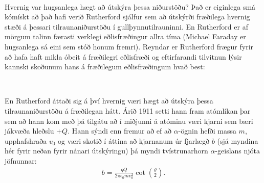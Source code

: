\ifdefined \wholebook \else\documentclass[oneside]{book}\usepackage{EdlBook}\graphicspath{{figures/}}
\begin{document}
\begin{tcolorbox}

 \\

\vspace{-0.3cm}
\end{tcolorbox}

Hvernig var hugsanlega hægt að útskýra þessa niðurstöðu? Það er eiginlega smá kómískt að það hafi verið Rutherford sjálfur sem að útskýrði fræðilega hvernig stæði á þessari tilraunaniðurstöðu í gullþynnutilrauninni. En Rutherford er af mörgum talinn færasti verklegi eðlisfræðingur allra tíma (Michael Faraday er hugsanlega sá eini sem stóð honum fremri). Reyndar er Rutherford frægur fyrir að hafa haft mikla óbeit á fræðilegri eðlisfræði og eftirfarandi tilvitnun lýsir kannski skoðunum hans á fræðilegum eðlisfræðingum hvað best:

\begin{tcolorbox}

 \\

\vspace{-0.3cm}
\end{tcolorbox}

En Rutherford áttaði sig á því hvernig væri hægt að útskýra þessa tilraunaniðurstöðu á fræðilegan hátt. Árið 1911 setti hann fram atómlíkan þar sem að hann kom með þá tilgátu að í miðjunni á atóminu væri kjarni sem bæri jákvæða hleðslu $+Q$. Hann sýndi enn fremur að ef að $\alpha$-ögnin hefði massa $m$, upphafshraða $v_0$ og væri skotið í áttina að kjarnanum úr fjarlægð $b$ (sjá myndina hér fyrir neðan fyrir nánari útskýringu) þá myndi tvístrunarhorn $\alpha$-geislans njóta jöfnunnar:
\begin{align*}
    b = \frac{qQ}{2\pi \epsilon_0 mv_0^2} \cot(\frac{\theta}{2}).
\end{align*}
\end{document}
